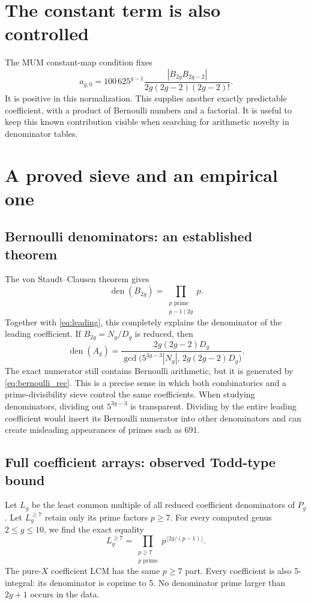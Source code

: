 \documentclass[11pt]{article}
\newcommand{\den}{\operatorname{den}}
\begin{document}
\section{The constant term is also controlled}
The MUM constant-map condition fixes
\begin{equation}\boxed{
 a_{g,0}=100\,625^{g-1}
 \frac{|B_{2g}B_{2g-2}|}{2g(2g-2)(2g-2)!}.}
\end{equation}
It is positive in this normalization. This supplies another exactly
predictable coefficient, with a product of Bernoulli numbers and a factorial.
It is useful to keep this known contribution visible when searching for
arithmetic novelty in denominator tables.

\section{A proved sieve and an empirical one}
\subsection{Bernoulli denominators: an established theorem}
The von Staudt--Clausen theorem gives
\[
 \den(B_{2g})=\prod_{\substack{p\text{ prime}\\p-1\mid2g}}p.
\]
Together with \eqref{eq:leading}, this completely explains the denominator
of the leading coefficient. If $B_{2g}=N_g/D_g$ is reduced, then
\[
 \den(A_g)=\frac{2g(2g-2)D_g}
 {\gcd\bigl(5^{3g-3}|N_g|,\,2g(2g-2)D_g\bigr)}.
\]
The exact numerator still contains Bernoulli arithmetic, but it is generated
by \eqref{eq:bernoulli_rec}. This is a precise sense in which both
combinatorics and a prime-divisibility sieve control the same coefficients.
When studying denominators, dividing out $5^{3g-3}$ is transparent.
Dividing by the entire leading coefficient would insert its Bernoulli numerator
into other denominators and can create misleading appearances of primes such
as $691$.

\subsection{Full coefficient arrays: observed Todd-type bound}
Let $L_g$ be the least common multiple of all reduced coefficient denominators
of $P_g$. Let $L_g^{\ge7}$ retain only its prime factors $p\ge7$.
For every computed genus $2\le g\le10$, we find the exact equality
\begin{equation}
 L_g^{\ge7}=\prod_{\substack{p\ge7\\p\text{ prime}}}
                    p^{\lfloor2g/(p-1)\rfloor}.
 \label{eq:empirical}
\end{equation}
The pure-$X$ coefficient LCM has the same $p\ge7$ part.
Every coefficient is also 5-integral: its denominator is coprime to 5.
No denominator prime larger than $2g+1$ occurs in the data.
\end{document}
